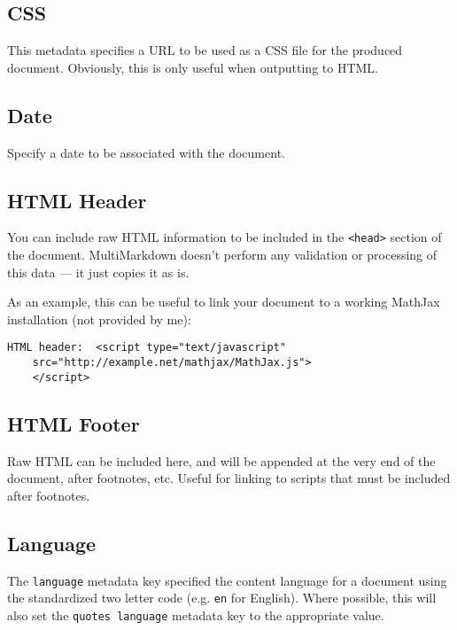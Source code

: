 \subsection{CSS}
\label{css}

This metadata specifies a URL to be used as a CSS file for the produced
document. Obviously, this is only useful when outputting to HTML.

\subsection{Date}
\label{date}

Specify a date to be associated with the document.

\subsection{HTML Header}
\label{htmlheader}

You can include raw HTML information to be included in the \texttt{<head>} section of the document. MultiMarkdown doesn't perform any validation or processing of this data --- it just copies it as is.

As an example, this can be useful to link your document to a working MathJax
installation (not provided by me):

\begin{verbatim}
HTML header:  <script type="text/javascript"
	src="http://example.net/mathjax/MathJax.js">
	</script>
\end{verbatim}

\subsection{HTML Footer}
\label{htmlfooter}

Raw HTML can be included here, and will be appended at the very end of the document, after footnotes, etc. Useful for linking to scripts that must be included after footnotes.

\subsection{Language}
\label{language}

The \texttt{language} metadata key specified the content language for a document using the standardized two letter code (e.g. \texttt{en} for English). Where possible, this will also set the \texttt{quotes language} metadata key to the appropriate value.

